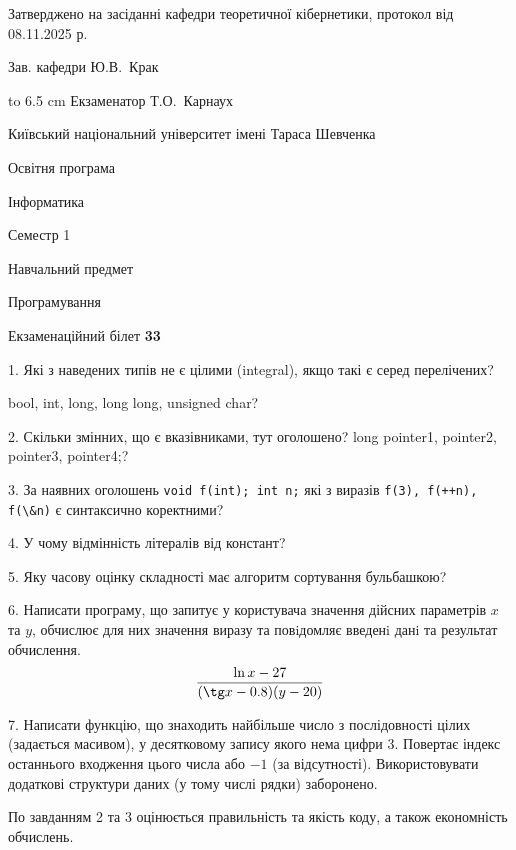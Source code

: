 \documentclass[12pt, ukrainian]{article}
\def\code#1{\Verb!#1!}
\begin{document}
{\smallskip\smallskip \begin {scriptsize} Затверджено на засіданні кафедри теоретичної кібернетики, протокол   від   08.11.2025 р.\par\smallskip\smallskip\smallskip\smallskip
{\parbox {6.5 cm} {Зав. кафедри \dotfill Ю.В.~Крак}}\hspace {0.7cm} {\hbox to 6.5 cm { Екзаменатор \dotfill Т.О.~Карнаух}} \end{scriptsize}}
\newpage
{{\begin {scriptsize}\par
{ \center  Київський національний університет імені Тараса Шевченка \par}
{\parbox {5 cm}{Освітня програма \hfill}{\parbox {7 cm}{Інформатика\hfill}}\parbox {6 cm}{\hfill Семестр 1}}\par
{\parbox {5 cm} {Навчальний предмет \hfill}\parbox {7 cm}{Програмування \hfill}\parbox {6cm}{\hfill}\par}\vspace{-15pt} \end{scriptsize}}{\center Екзаменаційний білет \No \textbf { 33 }\par}}
{%
1. Які з наведених типів не є цілими (integral), якщо такі є серед перелічених?

bool, int, long, long long, unsigned char?
\par
\vspace{2mm}
2. Скільки змінних, що є вказівниками, тут оголошено?
long pointer1, pointer2, pointer3, pointer4;?
\par
\vspace{2mm}
3. За наявних оголошень \code{void f(int); int n;} які з виразів \code{f(3), f(++n), f(\&n)} є синтаксично коректними?
\par
\vspace{2mm}
4. У чому відмінність літералів від констант?
\par
\vspace{2mm}
5. Яку часову оцінку складності має алгоритм сортування бульбашкою?
\par
\vspace{2mm}
6. Написати програму, що запитує у користувача значення дійсних параметрів $x$ та $y$, обчислює для них значення виразу та повiдомляє введенi данi та результат обчислення.
$$\frac{\ln x - 27}{(\tg x - 0.8) (y - 20)}$$ 

\par
7. Написати функцію, що знаходить найбільше число з послідовності цілих (задається масивом), у десятковому запису якого нема цифри 3. Повертає індекс останнього входження цього числа або $-1$ (за відсутності). Використовувати додаткові структури даних (у тому числі рядки) заборонено.

По завданням 2 та 3 оцінюється правильність та якість коду, а також економність обчислень.

}
\end{document}
